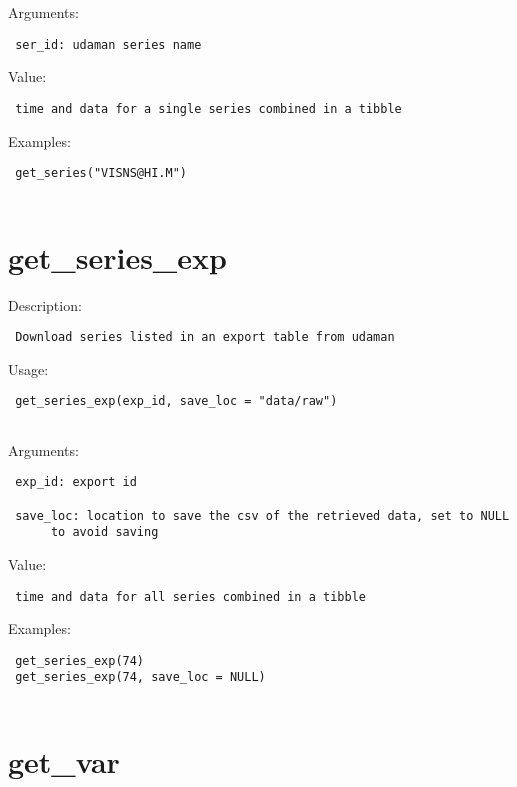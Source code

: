 \documentclass[
  letterpaper,
  DIV=11,
  numbers=noendperiod]{scrreport}
\begin{document}
Arguments:

\begin{verbatim}
 ser_id: udaman series name
\end{verbatim}

Value:

\begin{verbatim}
 time and data for a single series combined in a tibble
\end{verbatim}

Examples:

\begin{verbatim}
 get_series("VISNS@HI.M")
 
\end{verbatim}

\section{get\_series\_exp}\label{get_series_exp}

Description:

\begin{verbatim}
 Download series listed in an export table from udaman
\end{verbatim}

Usage:

\begin{verbatim}
 get_series_exp(exp_id, save_loc = "data/raw")
 
\end{verbatim}

Arguments:

\begin{verbatim}
 exp_id: export id

 save_loc: location to save the csv of the retrieved data, set to NULL
      to avoid saving
\end{verbatim}

Value:

\begin{verbatim}
 time and data for all series combined in a tibble
\end{verbatim}

Examples:

\begin{verbatim}
 get_series_exp(74)
 get_series_exp(74, save_loc = NULL)
 
\end{verbatim}

\section{get\_var}\label{get_var}
\end{document}

